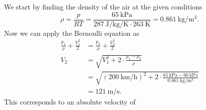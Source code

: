 \begin{derivation}
  We start by finding the density of the air at the given conditions
  \[ 
  \rho = \frac{p}{RT} = \frac{\qty{65}{\kPa} }{\qty{287}{\joule\per\kg\per\K} \cdot \qty{263}{\K} } = \qty{0,861}{\kg\per\cubic\m} 
  .\]
  Now we can apply the Bernoulli equation as
  \begin{align*}
    \frac{p_1}{\rho} + \frac{V_1^2}{2} &= \frac{p_2}{\rho} + \frac{V_2^2}{2} \\
    V_2 &= \sqrt{V_1^2 + 2\cdot \frac{p_1 - p_2}{\rho}} \\
    &= \sqrt{\left( \qty{200}{\km\per\hour}  \right)^2 + 2 \cdot \frac{\qty{65}{\kPa} - \qty{60}{\kPa}}{\qty{0,861}{\kg\per\cubic\m} }} \\
    &= \qty{121}{\m\per\s} 
  .\end{align*}
  This corresponds to an absolute velocity of
\end{derivation}
